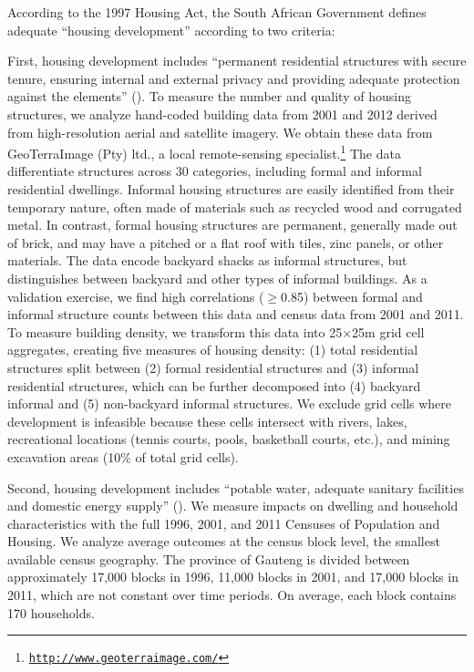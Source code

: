 \documentclass[12pt]{article}
\begin{document}
According to the 1997 Housing Act, the South African Government defines adequate ``housing development'' according to two criteria: 

First, housing development includes ``permanent residential structures with secure tenure, ensuring internal and external privacy and providing adequate protection against the elements'' (\cite{housingact}).  To measure the number and quality of housing structures, we analyze hand-coded building data from 2001 and 2012 derived from high-resolution aerial and satellite imagery. We obtain these data from GeoTerraImage (Pty) ltd., a local remote-sensing specialist.\footnote{\href{http://www.geoterraimage.com/}{\tt http://www.geoterraimage.com/}} The data differentiate structures across 30 categories, including formal and informal residential dwellings. Informal housing structures are easily identified from their temporary nature, often made of materials such as recycled wood and corrugated metal. In contrast, formal housing structures are permanent, generally made out of brick, and may have a pitched or a flat roof with tiles, zinc panels, or other materials. The data encode backyard shacks as informal structures, but distinguishes between backyard and other types of informal buildings.  As a validation exercise, we find high correlations ($\geq$0.85) between formal and informal structure counts between this data and census data from 2001 and 2011.  To measure building density, we transform this data into 25$\times$25m grid cell aggregates, creating five measures of housing density: (1) total residential structures split between (2) formal residential structures and (3) informal residential structures, which can be further decomposed into (4) backyard informal and (5) non-backyard informal structures.  We exclude grid cells where development is infeasible because these cells intersect with rivers, lakes, recreational locations (tennis courts, pools, basketball courts, etc.), and mining excavation areas (10\% of total grid cells).  

Second, housing development includes ``potable water, adequate sanitary facilities and domestic energy supply'' (\cite{housingact}).  We measure impacts on dwelling and household characteristics with the full 1996, 2001, and 2011 Censuses of Population and Housing. We analyze average outcomes at the census block level, the smallest available census geography.  The province of Gauteng is divided between approximately 17,000 blocks in 1996, 11,000 blocks in 2001, and 17,000 blocks in 2011, which are not constant over time periods.  On average, each block contains 170 households. 
\end{document}
